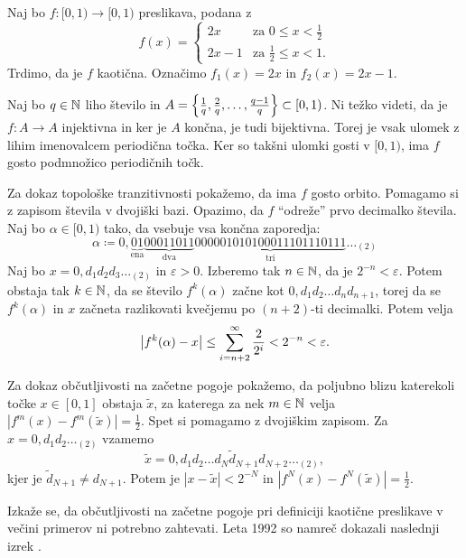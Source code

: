 \begin{zgled} \label{ex:double}
    Naj bo \(f \colon [0, 1) \to [0, 1)\) preslikava, podana z
    \[
        f (x) =
        \begin{cases}
            2x     & \text{za } 0 \leq x < \frac{1}{2}  \\
            2x - 1 & \text{za } \frac{1}{2} \leq x < 1.
        \end{cases}
    \]
    Trdimo, da je \(f\) kaotična. Označimo \(f_1 (x) = 2 x\) in \(f_2 (x) = 2x - 1\).

    Naj bo \(q \in \mathbb N\) liho število in \(A = \left\{ \frac{1}{q}, \frac{2}{q}, \dots, \frac{q - 1}{q} \right\} \subset [0, 1)\). Ni težko videti, da je \(f \colon A \to A\) injektivna in ker je \(A\) končna, je tudi bijektivna. Torej je vsak ulomek z lihim imenovalcem periodična točka. Ker so takšni ulomki gosti v \([0, 1)\), ima \(f\) gosto podmnožico periodičnih točk.

    Za dokaz topološke tranzitivnosti pokažemo, da ima \(f\) gosto orbito. Pomagamo si z zapisom števila v dvojiški bazi. Opazimo, da \(f\) ``odreže'' prvo decimalko števila. Naj bo \(\alpha \in [0, 1)\) tako, da vsebuje vsa končna zaporedja:
    \[\alpha \coloneq 0, \underbrace{0 1}_{\text{ena}} \underbrace{00011011}_{\text{dva}} \underbrace{000 001 010 100 011 101 110 111}_{\text{tri}} \dots_{(2)}\]
    Naj bo \(x = 0{,}d_1 d_2 d_3 \dots_{(2)}\) in \(\varepsilon > 0\). Izberemo tak \(n \in \mathbb N\), da je \(2^{- n} < \varepsilon\). Potem obstaja tak \(k \in \mathbb N\), da se število \(f^k (\alpha)\) začne kot \(0{,}d_1 d_2 \dots d_n d_{n + 1}\), torej da se \(f^k (\alpha)\) in \(x\) začneta razlikovati kvečjemu po \((n + 2)\)-ti decimalki. Potem velja
    \[\left\lvert f^k (\alpha) - x\right\rvert \leq \sum_{i = n + 2}^{\infty} \frac{2}{2^{i}} < 2^{- n} < \varepsilon.\]

    Za dokaz občutljivosti na začetne pogoje pokažemo, da poljubno blizu katerekoli točke \(x \in [0, 1]\) obstaja \(\tilde{x}\), za katerega za nek \(m \in \mathbb N\) velja \(|f^m (x) - f^m (\tilde{x})| = \frac{1}{2}\). Spet si pomagamo z dvojiškim zapisom. Za \(x = 0{,}d_1 d_2 \dots_{(2)}\) vzamemo
    \[\tilde{x} = 0{,}d_1 d_2 \dots d_N \tilde{d}_{N + 1} d_{N + 2} \dots_{(2)},\]
    kjer je \(\tilde{d}_{N + 1} \neq d_{N + 1}\). Potem je \(|x - \tilde{x}| < 2^{- N}\) in \(|f^N (x) - f^N (\tilde{x})| = \frac{1}{2}\).
\end{zgled}

\noindent Izkaže se, da občutljivosti na začetne pogoje pri definiciji kaotične preslikave v večini primerov ni potrebno zahtevati. Leta \num{1992} so namreč dokazali naslednji izrek \cite{Banks_1992}.

